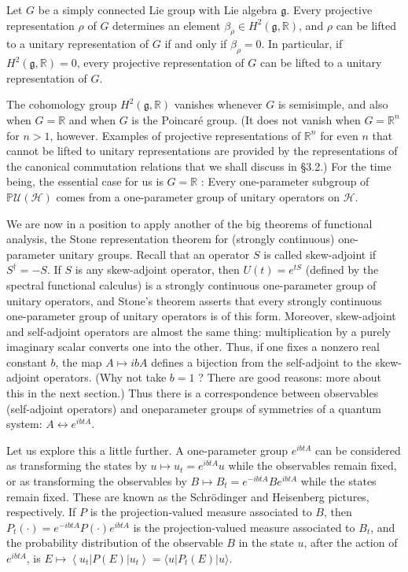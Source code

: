 \documentclass[10pt, letterpaper]{article}
\begin{document}
Let $G$ be a simply connected Lie group with Lie algebra $\mathfrak{g}$. Every projective representation $\rho$ of $G$ determines an element $\beta_{\rho} \in H^{2}(\mathfrak{g}, \mathbb{R})$, and $\rho$ can be lifted to a unitary representation of $G$ if and only if $\beta_{\rho}=0$. In particular, if $H^{2}(\mathfrak{g}, \mathbb{R})=0$, every projective representation of $G$ can be lifted to a unitary representation of $G$.

The cohomology group $H^{2}(\mathfrak{g}, \mathbb{R})$ vanishes whenever $G$ is semisimple, and also when $G=\mathbb{R}$ and when $G$ is the Poincaré group. (It does not vanish when $G=\mathbb{R}^{n}$ for $n>1$, however. Examples of projective representations of $\mathbb{R}^{n}$ for even $n$ that cannot be lifted to unitary representations are provided by the representations of the canonical commutation relations that we shall discuss in §3.2.) For the time being, the essential case for us is $G=\mathbb{R}$ : Every one-parameter subgroup of $\mathbb{P} \mathcal{U}(\mathcal{H})$ comes from a one-parameter group of unitary operators on $\mathcal{H}$.

We are now in a position to apply another of the big theorems of functional analysis, the Stone representation theorem for (strongly continuous) one-parameter unitary groups. Recall that an operator $S$ is called skew-adjoint if $S^{\dagger}=-S$. If $S$ is any skew-adjoint operator, then $U(t)=e^{t S}$ (defined by the spectral functional calculus) is a strongly continuous one-parameter group of unitary operators, and Stone's theorem asserts that every strongly continuous one-parameter group of unitary operators is of this form. Moreover, skew-adjoint and self-adjoint operators are almost the same thing: multiplication by a purely imaginary scalar converts one into the other. Thus, if one fixes a nonzero real constant $b$, the map $A \mapsto i b A$ defines a bijection from the self-adjoint to the skew-adjoint operators. (Why not take $b=1$ ? There are good reasons: more about this in the next section.) Thus there is a correspondence between observables (self-adjoint operators) and oneparameter groups of symmetries of a quantum system: $A \leftrightarrow e^{i b t A}$.

Let us explore this a little further. A one-parameter group $e^{i b t A}$ can be considered as transforming the states by $u \mapsto u_{t}=e^{i b t A} u$ while the observables remain fixed, or as transforming the observables by $B \mapsto B_{t}=e^{-i b t A} B e^{i b t A}$ while the states remain fixed. These are known as the Schrödinger and Heisenberg pictures, respectively. If $P$ is the projection-valued measure associated to $B$, then $P_{t}(\cdot)=e^{-i b t A} P(\cdot) e^{i b t A}$ is the projection-valued measure associated to $B_{t}$, and the probability distribution of the observable $B$ in the state $u$, after the action of $e^{i b t A}$, is $E \mapsto\left\langle u_{t}\right| P(E)\left|u_{t}\right\rangle=\langle u| P_{t}(E)|u\rangle$.
\end{document}
